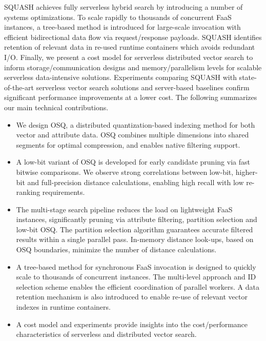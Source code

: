 SQUASH achieves fully serverless hybrid search by introducing a number of systems optimizations.
To scale rapidly to thousands of concurrent FaaS instances, a tree-based method is introduced for large-scale invocation with efficient bidirectional data flow via request/response payloads. 
SQUASH identifies retention of relevant data in re-used runtime containers which avoids redundant I/O. Finally, we present a cost model for serverless distributed vector search to inform storage/communication designs and memory/parallelism levels for scalable serverless data-intensive solutions. 
Experiments comparing SQUASH with state-of-the-art serverless vector search solutions and server-based baselines confirm significant performance improvements at a lower cost.
The following summarizes our main technical contributions.
\begin{itemize}
    \item We design OSQ, a distributed quantization-based indexing method for both vector and attribute data. OSQ combines multiple dimensions into shared segments for optimal compression, and enables native filtering support. %
    \item A low-bit variant of OSQ is developed for early candidate pruning via fast bitwise comparisons. We observe strong correlations between low-bit, higher-bit and full-precision distance calculations, enabling high recall with low re-ranking requirements.
    \item The multi-stage search pipeline reduces the load on lightweight FaaS instances, significantly pruning via attribute filtering, partition selection and low-bit OSQ. 
    The partition selection algorithm guarantees accurate filtered results within a single parallel pass. 
    In-memory distance look-ups, based on OSQ boundaries, minimize the number of distance calculations. %
    \item A tree-based method for synchronous FaaS invocation is designed to quickly scale to thousands of concurrent instances. The multi-level approach and ID selection scheme enables the efficient coordination of parallel workers. A data retention mechanism is also introduced to enable re-use of relevant vector indexes in runtime containers.
    \item A cost model and experiments provide insights into the cost/performance characteristics of serverless and distributed vector search.
\end{itemize}

